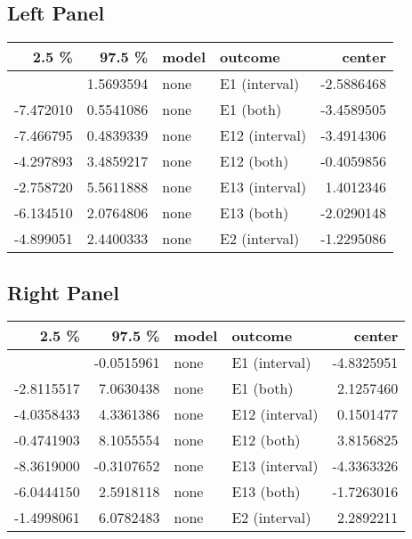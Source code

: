 \documentclass[
  a4paper,
  DIV=11,
  numbers=noendperiod]{scrreprt}
\begin{document}
\hypertarget{left-panel-1}{%
\subsection{Left Panel}\label{left-panel-1}}

\begin{longtable}[]{@{}rrllr@{}}
\toprule\noalign{}
2.5 \% & 97.5 \% & model & outcome & center \\
\midrule\noalign{}
\endhead
\bottomrule\noalign{}
\endlastfoot
-6.746653 & 1.5693594 & none & E1 (interval) & -2.5886468 \\
-7.472010 & 0.5541086 & none & E1 (both) & -3.4589505 \\
-7.466795 & 0.4839339 & none & E12 (interval) & -3.4914306 \\
-4.297893 & 3.4859217 & none & E12 (both) & -0.4059856 \\
-2.758720 & 5.5611888 & none & E13 (interval) & 1.4012346 \\
-6.134510 & 2.0764806 & none & E13 (both) & -2.0290148 \\
-4.899051 & 2.4400333 & none & E2 (interval) & -1.2295086 \\
\end{longtable}

\hypertarget{right-panel-1}{%
\subsection{Right Panel}\label{right-panel-1}}

\begin{longtable}[]{@{}rrllr@{}}
\toprule\noalign{}
2.5 \% & 97.5 \% & model & outcome & center \\
\midrule\noalign{}
\endhead
\bottomrule\noalign{}
\endlastfoot
-9.6135941 & -0.0515961 & none & E1 (interval) & -4.8325951 \\
-2.8115517 & 7.0630438 & none & E1 (both) & 2.1257460 \\
-4.0358433 & 4.3361386 & none & E12 (interval) & 0.1501477 \\
-0.4741903 & 8.1055554 & none & E12 (both) & 3.8156825 \\
-8.3619000 & -0.3107652 & none & E13 (interval) & -4.3363326 \\
-6.0444150 & 2.5918118 & none & E13 (both) & -1.7263016 \\
-1.4998061 & 6.0782483 & none & E2 (interval) & 2.2892211 \\
\end{longtable}
\end{document}

